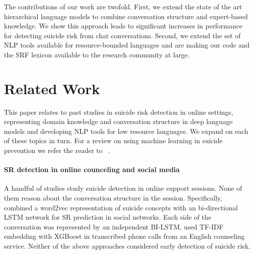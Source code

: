 \documentclass[letterpaper]{article} %
\begin{document}
The contributions of our work are twofold. First, we extend the state of the art hierarchical language models to combine conversation structure and expert-based knowledge. We show  this approach leads to significant increases in performance for detecting suicide risk from chat conversations.  Second, we extend the set of NLP tools available for resource-bounded languages and are making our code and the  SRF lexicon available to the research community at large.


\section{Related Work}


This paper relates to past studies in  suicide risk detection in online settings,  representing domain knowledge and conversation structure in deep 
language models and developing NLP tools for low resource languages. We expand on each of these topics in turn.  For a review on using machine learning in suicide prevention we  refer the reader to ~\citet{jiSuicidalIdeationDetection2021}.

\paragraph{SR detection in online counceling and social media}
A  handful of studies study suicide detection in online support sessions. None of them reason about  the conversation structure in the session.
Specifically, 
\citet{xuDetectingSuicideRisk2021} combined 
 a word2vec representation of suicide concepts with an bi-directional LSTM network for SR prediction in social networks. Each side of the conversation was represented by an independent BI-LSTM.
\citet{bantilanJustTimeCrisis2021} used TF-IDF embedding with  XGBoost  in transcribed phone calls from an English counseling service.  Neither of the above approaches considered early detection of suicide risk.
\end{document}
